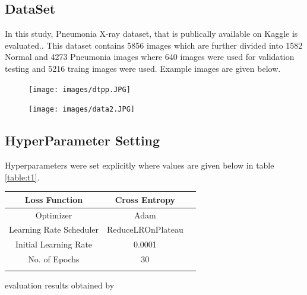 \documentclass{ieeeaccess}
\begin{document}
\subsection{DataSet}
In this study, Pneumonia X-ray dataset, that is publically available on Kaggle is evaluated.. This dataset contains 5856 images which are further divided into 1582 Normal and 4273 Pneumonia images where 640 images were used for validation testing and 5216 traing images were used. Example images are given below.


\begin{figure}[h]
\centering
\begin{minipage}{.45\linewidth}
  \texttt{[image: images/dtpp.JPG]}
  \label{img1}
\end{minipage}
\hspace{.05\linewidth}
\begin{minipage}{.45\linewidth}
  \texttt{[image: images/data2.JPG]}
  \label{img2}
\end{minipage}
\end{figure}

\subsection{HyperParameter Setting}
Hyperparameters were set explicitly where values are given below in table \ref{table:t1}.

\begin{center}
\begin{tabular}{ |c|c|c| } 
 \hline
 Loss Function & Cross Entropy \\ 
 \hline
  Optimizer & Adam \\ 
 \hline
 Learning Rate Scheduler & ReduceLROnPlateau \\ 
 \hline
 Initial Learning Rate & 0.0001 \\ 
 \hline
 No. of Epochs & 30 \\ 
 \hline
\label{table:t1}
\end{tabular}
\end{center}

evaluation results obtained by
\end{document}

